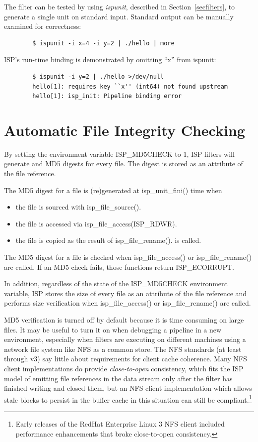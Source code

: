 \documentclass{article}
\begin{document}
The filter can be tested by using
{\em ispunit}, described in Section~\ref{secfilters},
to generate a single unit on standard input.  Standard output can 
be manually examined for correctness:
\begin{verbatim}
        $ ispunit -i x=4 -i y=2 | ./hello | more
\end{verbatim}

ISP's run-time binding is demonstrated by omitting ``x'' from ispunit:
\begin{verbatim}
        $ ispunit -i y=2 | ./hello >/dev/null
        hello[1]: requires key ``x'' (int64) not found upstream
        hello[1]: isp_init: Pipeline binding error
\end{verbatim}

\section{Automatic File Integrity Checking}

By setting the environment variable ISP\_MD5CHECK to 1, ISP filters
will generate and MD5 digests for every file.  The digest is stored
as an attribute of the file reference.

The MD5 digest for a file is (re)generated at isp\_unit\_fini() time when
\begin{itemize}
\item{the file is sourced with isp\_file\_source().}
\item{the file is accessed via isp\_file\_access(ISP\_RDWR).}
\item{the file is copied as the result of isp\_file\_rename().}
is called.  
\end{itemize}

The MD5 digest for a file is checked when isp\_file\_access() or 
isp\_file\_rename() are called.  If an MD5 check fails, those
functions return ISP\_ECORRUPT.

In addition, regardless of the state of the ISP\_MD5CHECK environment
variable, ISP stores the size of every file as an attribute of the file
reference and performs size verification when isp\_file\_access() or
isp\_file\_rename() are called.

MD5 verification is turned off by default because it is time consuming
on large files.  It may be useful to turn it on when debugging a pipeline 
in a new environment, especially when filters are executing on different 
machines using a network file system like NFS as a common store.
The NFS standards (at least through v3) say little about requirements for
client cache coherence.  Many NFS client implementations do provide 
{\em close-to-open} consistency\cite{Lever2001}, which fits the ISP 
model of emitting file 
references in the data stream only after the filter has finished writing 
and closed them, but an NFS client implementation which allows stale
blocks to persist in the buffer cache in this situation can still be
compliant.\footnote{Early releases of the RedHat Enterprise Linux 3 NFS client
included performance enhancements that broke close-to-open consistency.}
\end{document}
